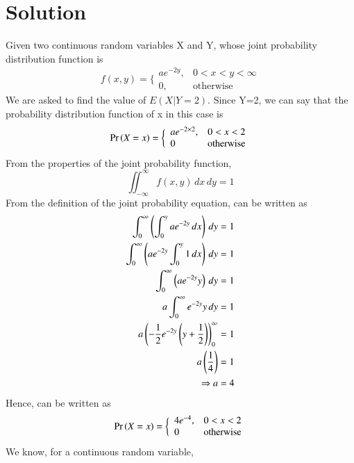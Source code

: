 \documentclass[journal,12pt,twocolumn]{IEEEtran}
\begin{document}
\section{\textbf{Solution}}
Given two continuous random variables X and Y, whose joint probability distribution function is\newline
\begin{equation}
    f(x,y) = \bigg\{ \begin{array}{lr}
    ae^{-2y}, & 0<x<y<\infty  \\
     0, &\text{otherwise} 
\end{array}
\end{equation}
We are asked to find the value of $E(X|Y=2)$. Since Y=2, we can say that the probability distribution function of x in this case is
\begin{equation}
    \Pr\left(X=x\right) = \bigg\{ \begin{array}{lr}
         ae^{-2\times 2}, &0<x<2  \\
         0 & \text{otherwise} 
    \end{array}
\end{equation}
From the properties of the joint probability function,
\begin{equation}
    \iint_{-\infty}^{\infty}f(x,y) \,dx\,dy = 1
\end{equation}
From the definition of the joint probability equation,  can be written as
\begin{align}
    \int_0^{\infty}\left(\int_0^y ae^{-2y} \,dx\right) \,dy &= 1 \\
    \int_0^{\infty}\left(ae^{-2y}\int_0^y 1 \,dx\right) \,dy &=1 \\
    \int_0^{\infty}\left(ae^{-2y}y\right) \,dy &= 1 \\
    a\int_0^{\infty} e^{-2y}y \,dy &= 1 \\
    a\left(-\frac{1}{2}e^{-2y}\left(y+\frac{1}{2}\right)\right)_0^{\infty} &= 1 \\
    a \left(\frac{1}{4}\right) &= 1 \\
    \Rightarrow a &= 4
\end{align}
Hence,  can be written as
\begin{equation}
    \Pr\left(X=x\right) = \bigg\{ \begin{array}{lr}
         4e^{-4}, &0<x<2  \\
         0 & \text{otherwise} 
    \end{array}
\end{equation}
We know, for a continuous random variable,
\end{document}
